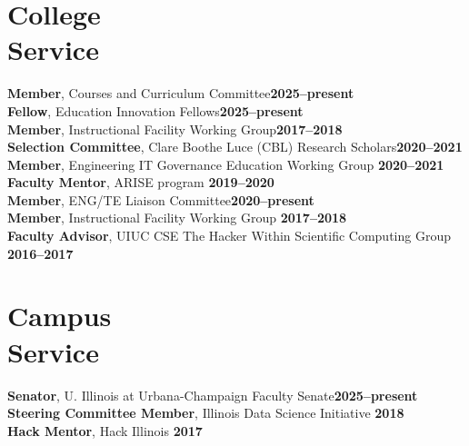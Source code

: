 \documentclass[margin,line]{resume}
\begin{document}
\begin{resume}
    \section{\mysidestyle College\\Service}
            \textbf{Member}, Courses and Curriculum Committee\hfill \textbf{2025--present}\vspace{.5mm}\\%
            \textbf{Fellow}, Education Innovation Fellows\hfill \textbf{2025--present}\vspace{.5mm}\\%
            \textbf{Member}, Instructional Facility Working Group\hfill \textbf{2017--2018}\vspace{.5mm}\\%
            \textbf{Selection Committee}, Clare Boothe Luce (CBL) Research Scholars\hfill \textbf{2020--2021}\vspace{.5mm}\\%
            \textbf{Member}, Engineering IT Governance Education Working Group \hfill\textbf{2020--2021}\vspace{.5mm}\\%
            \textbf{Faculty Mentor}, ARISE program \hfill \textbf{2019--2020}\vspace{.5mm}\\%
                \textbf{Member}, ENG/TE Liaison Committee\hfill \textbf{2020--present}\vspace{.5mm}\\%
                \textbf{Member}, Instructional Facility Working Group \hfill \textbf{2017--2018}\vspace{.5mm}\\%
                \textbf{Faculty Advisor}, UIUC CSE The Hacker Within Scientific Computing Group \hfill \textbf{2016--2017}\vspace{.5mm}\\%
    \section{\mysidestyle Campus\\Service}
                \textbf{Senator}, U. Illinois at Urbana-Champaign Faculty Senate\hfill \textbf{2025--present}\vspace{.5mm}\\%
                \textbf{Steering Committee Member}, Illinois Data Science Initiative \hfill \textbf{2018}\vspace{.5mm}\\%
                \textbf{Hack Mentor}, Hack Illinois \hfill \textbf{2017}\vspace{.5mm}\\%


\end{resume}
\end{document}
